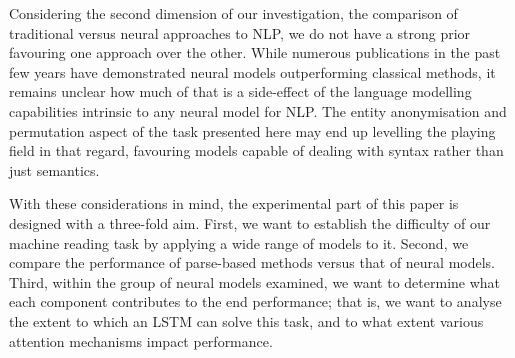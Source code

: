 \documentclass{article}
\begin{document}
Considering the second dimension of our investigation, the comparison of
traditional versus neural approaches to NLP, we do not have a strong prior
favouring one approach over the other. While numerous publications in the past
few years have demonstrated neural models outperforming classical methods, it
remains unclear how much of that is a side-effect of the language modelling
capabilities intrinsic to any neural model for NLP. The entity anonymisation and
permutation aspect of the task presented here may end up levelling the playing
field in that regard, favouring models capable of dealing with syntax rather
than just semantics.

With these considerations in mind, the experimental part of this paper is
designed with a three-fold aim. First, we want to establish the difficulty of our
machine reading task by applying a wide range of models to it. Second, we compare
the performance of parse-based methods versus that of neural models. Third,
within the group of neural models examined, we want to determine what each
component contributes to the end performance; that is, we want to analyse the
extent to which an LSTM can solve this task, and to what extent various
attention mechanisms impact performance.

\newcommand{\ee}[1][]{\text{\sc{e}#1}}
\end{document}
